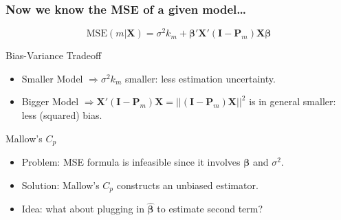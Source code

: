 \begin{frame}
  \frametitle{Now we know the MSE of a given model\dots}
  
  \[\text{MSE}(m|\mathbf{X}) = \sigma^2 k_m + \boldsymbol{\beta}'\mathbf{X}'(\mathbf{I} - \mathbf{P}_m)\mathbf{X}\boldsymbol{\beta}\]

\begin{block}{Bias-Variance Tradeoff}
  \pause
  \begin{itemize}
    \item Smaller Model $\Rightarrow \sigma^2 k_m$ smaller: less estimation uncertainty. \pause
    \item Bigger Model $\Rightarrow \mathbf{X}'(\mathbf{I} - \mathbf{P}_m)\mathbf{X} = \left|\left|(\mathbf{I} - \mathbf{P}_m)\mathbf{X} \right|\right|^2$ is in general smaller: less (squared) bias.
  \end{itemize}
\end{block}

\vspace{-1em}

\pause
\begin{alertblock}{Mallow's $C_p$}
  \begin{itemize}
    \item Problem: MSE formula is infeasible since it involves $\boldsymbol{\beta}$ and $\sigma^2$.\pause
    \item Solution: Mallow's $C_p$ constructs an unbiased estimator.\pause
    \item Idea: what about plugging in $\widehat{\boldsymbol{\beta}}$ to estimate second term?
  \end{itemize}
\end{alertblock}

\end{frame}
